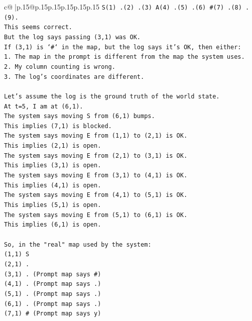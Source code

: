 \documentclass{article}
\begin{document}
{\begin{supertabular}{c@{$\;$}|p{.15\linewidth}@{}p{.15\linewidth}p{.15\linewidth}p{.15\linewidth}p{.15\linewidth}p{.15\linewidth}}
{{{\texttt{S(1) .(2) .(3) A(4) .(5) .(6) \#(7) .(8) .(9).} \\
\texttt{This seems correct.} \\
\texttt{But the log says passing (3,1) was OK.} \\
\texttt{If (3,1) is `\#` in the map, but the log says it's OK, then either:} \\
\texttt{1. The map in the prompt is different from the map the system uses.} \\
\texttt{2. My column counting is wrong.} \\
\texttt{3. The log's coordinates are different.} \\
\\ 
\texttt{Let's assume the log is the ground truth of the world state.} \\
\texttt{At t=5, I am at (6,1).} \\
\texttt{The system says moving S from (6,1) bumps.} \\
\texttt{This implies (7,1) is blocked.} \\
\texttt{The system says moving E from (1,1) to (2,1) is OK.} \\
\texttt{This implies (2,1) is open.} \\
\texttt{The system says moving E from (2,1) to (3,1) is OK.} \\
\texttt{This implies (3,1) is open.} \\
\texttt{The system says moving E from (3,1) to (4,1) is OK.} \\
\texttt{This implies (4,1) is open.} \\
\texttt{The system says moving E from (4,1) to (5,1) is OK.} \\
\texttt{This implies (5,1) is open.} \\
\texttt{The system says moving E from (5,1) to (6,1) is OK.} \\
\texttt{This implies (6,1) is open.} \\
\\ 
\texttt{So, in the "real" map used by the system:} \\
\texttt{(1,1) S} \\
\texttt{(2,1) .} \\
\texttt{(3,1) . (Prompt map says \#)} \\
\texttt{(4,1) . (Prompt map says .)} \\
\texttt{(5,1) . (Prompt map says .)} \\
\texttt{(6,1) . (Prompt map says .)} \\
\texttt{(7,1) \# (Prompt map says y)} \\
}}}
\end{supertabular}}
\end{document}
